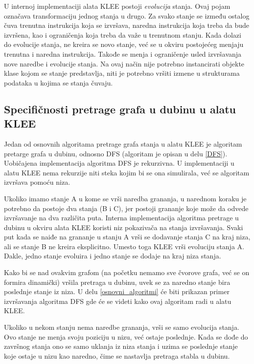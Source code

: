 \documentclass[12pt,oneside]{memoir}
\begin{document}
U internoj implementaciji alata KLEE postoji \textit{evolucija} stanja. Ovaj pojam označava transformaciju jednog stanja u drugo. Za svako stanje se između ostalog čuva trenutna instrukcija koja se izvršava, naredna instrukcija koja treba da bude izvršena, kao i ograničenja koja treba da važe u trenutnom stanju. Kada dolazi do evolucije stanja, ne kreira se novo stanje, već se u okviru postojećeg menjaju trenutna i naredna instrukcija. Takođe se menja i ograničenje usled izvršavanja nove naredbe i evolucije stanja. Na ovaj način nije potrebno instancirati objekte klase kojom se stanje predstavlja, niti je potrebno vršiti izmene u strukturama podataka u kojima se stanja čuvaju.

\subsection{Specifičnosti pretrage grafa u dubinu u alatu KLEE}
Jedan od osnovnih algoritama pretrage grafa stanja u alatu KLEE je algoritam pretarge grafa u dubinu, odnosno DFS (algoritam je opisan u delu \ref{DFS}). Uobičajena implementacija algoritma DFS je rekurzivna. U implementaciji u alatu KLEE nema rekurzije niti steka kojim bi se ona simulirala, već se algoritam izvršava pomoću niza.

Ukoliko imamo stanje A u kome se vrši naredba grananja, u narednom koraku je potrebno da postoje dva stanja (B i C), jer postoji grananje koje može da odvede izvršavanje na dva različita puta. Interna implementacija algoritma pretrage u dubinu u okviru alata KLEE koristi niz pokazivača na stanja izvršavanja. Svaki put kada se naiđe na grananje u stanju A vrši se dodavanje stanja C na kraj niza, ali se stanje B ne kreira eksplicitno. Umesto toga KLEE vrši evoluciju stanja A. Dakle, jedno stanje evoluira i jedno stanje se dodaje na kraj niza stanja. 

Kako bi se nad ovakvim grafom (na početku nemamo sve čvorove grafa, već se on formira dinamički) vršila pretraga u dubinu, uvek se za naredno stanje bira poslednje stanje iz niza. U delu \ref{osnovni_algoritmi} će biti prikazan primer izvršavanja algoritma DFS gde će se videti kako ovaj algoritam radi u alatu KLEE. 

Ukoliko u nekom stanju nema naredbe grananja, vrši se samo evolucija stanja. Ovo stanje ne menja svoju poziciju u nizu, već ostaje poslednje. Kada se dođe do završnog stanja ono se samo uklanja iz niza stanja i uzima se poslednje stanje koje ostaje u nizu kao naredno, čime se nastavlja pretraga stabla u dubinu. 
\end{document}
